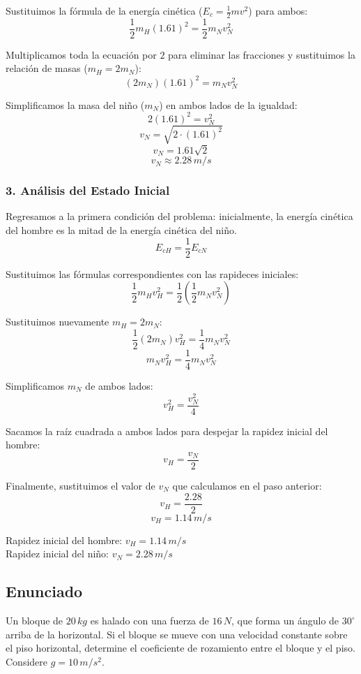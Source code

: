 \documentclass[12pt, a4paper]{article}
\begin{document}
Sustituimos la fórmula de la energía cinética ($E_c = \frac{1}{2}mv^2$) para ambos:
$$ \frac{1}{2} m_H (1.61)^2 = \frac{1}{2} m_N v_N^2 $$

Multiplicamos toda la ecuación por $2$ para eliminar las fracciones y sustituimos la relación de masas ($m_H = 2m_N$):
$$ (2m_N) (1.61)^2 = m_N v_N^2 $$

Simplificamos la masa del niño ($m_N$) en ambos lados de la igualdad:
$$ 2 (1.61)^2 = v_N^2 $$
$$ v_N = \sqrt{2 \cdot (1.61)^2} $$
$$ v_N = 1.61 \sqrt{2} $$
$$ v_N \approx 2.28 \, \si{m/s} $$

\subsubsection*{3. Análisis del Estado Inicial}
Regresamos a la primera condición del problema: inicialmente, la energía cinética del hombre es la mitad de la energía cinética del niño.
$$ E_{cH} = \frac{1}{2} E_{cN} $$

Sustituimos las fórmulas correspondientes con las rapideces iniciales:
$$ \frac{1}{2} m_H v_H^2 = \frac{1}{2} \left( \frac{1}{2} m_N v_N^2 \right) $$

Sustituimos nuevamente $m_H = 2m_N$:
$$ \frac{1}{2} (2m_N) v_H^2 = \frac{1}{4} m_N v_N^2 $$
$$ m_N v_H^2 = \frac{1}{4} m_N v_N^2 $$

Simplificamos $m_N$ de ambos lados:
$$ v_H^2 = \frac{v_N^2}{4} $$

Sacamos la raíz cuadrada a ambos lados para despejar la rapidez inicial del hombre:
$$ v_H = \frac{v_N}{2} $$

Finalmente, sustituimos el valor de $v_N$ que calculamos en el paso anterior:
$$ v_H = \frac{2.28}{2} $$
$$ v_H = 1.14 \, \si{m/s} $$

\begin{tcolorbox}[colback=green!5!white, colframe=green!50!black, title=Respuesta Final]
\centering
Rapidez inicial del hombre: $v_H = 1.14 \, \si{m/s}$ \\
Rapidez inicial del niño: $v_N = 2.28 \, \si{m/s}$
\end{tcolorbox}

\newpage

\subsection*{Enunciado}
Un bloque de $20 \, \si{kg}$ es halado con una fuerza de $16 \, \si{N}$, que forma un ángulo de $30^\circ$ arriba de la horizontal. Si el bloque se mueve con una velocidad constante sobre el piso horizontal, determine el coeficiente de rozamiento entre el bloque y el piso. Considere $g = 10 \, \si{m/s^2}$.
\end{document}
